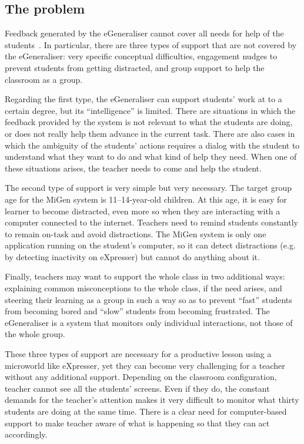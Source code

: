 \subsection{The problem}
\label{sec:problem}

Feedback generated by the eGeneraliser cannot cover all needs for help
of the students~\cite{Mavrikis2012Design}. In particular, there are three types
of support that are not covered by the eGeneraliser: very specific
conceptual difficulties, engagement nudges to prevent students from
getting distracted, and group support to help the classroom as a
group.

Regarding the first type, the eGeneraliser can support students' work
at to a certain degree, but its ``intelligence'' is limited. There are
situations in which the feedback provided by the system is not
relevant to what the students are doing, or does not really help them
advance in the current task. There are also cases in which the
ambiguity of the students' actions requires a dialog with the student
to understand what they want to do and what kind of help they
need. When one of these situations arises, the teacher needs to come and
help the student. 

The second type of support is very simple but very necessary. The
target group age for the MiGen system is 11--14-year-old children. At
this age, it is easy for learner to become distracted, even more so when
they are interacting with a computer connected to the
internet. Teachers need to remind students constantly to remain
on-task and avoid distractions. The MiGen system is only one
application running on the student's computer, so it can detect distractions
(e.g. by detecting inactivity on eXpresser) but cannot do anything
about it. 

Finally, teachers may want to support the whole class in two additional ways:
explaining common misconceptions to the whole class, if the need
arises, and steering their learning as a group in such a way so as to prevent ``fast''
students from becoming bored and ``slow'' students from becoming
frustrated. The eGeneraliser is a system that monitors only
individual interactions, not those of the whole group. 

These three types of support are necessary for a productive lesson
using a microworld like eXpresser, yet they can become very
challenging for a teacher without any additional support. Depending on
the classroom configuration, teacher cannot see all the students'
screens. Even if they do, the constant demands for the teacher's attention
makes it very difficult to monitor what thirty students are doing at
the same time. There is a clear need for computer-based support to
make teacher aware of what is happening so that they can act
accordingly. 

